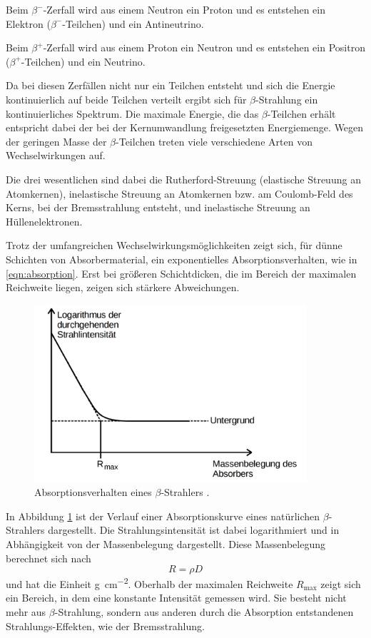 \documentclass[
  bibliography=totoc,     %
  captions=tableheading,  %
  titlepage=firstiscover, %
]{scrartcl}
\begin{document}
\noindent
Beim $\beta^-$-Zerfall wird aus einem Neutron ein Proton und es entstehen
ein Elektron ($\beta^-$-Teilchen) und ein Antineutrino.

\noindent
Beim $\beta^+$-Zerfall wird aus einem Proton ein Neutron und es entstehen
ein Positron ($\beta^+$-Teilchen) und ein Neutrino.

\noindent
Da bei diesen Zerfällen nicht nur ein Teilchen entsteht und sich die Energie
kontinuierlich auf beide Teilchen verteilt ergibt sich für $\beta$-Strahlung
ein kontinuierliches Spektrum. Die maximale Energie, die das $\beta$-Teilchen
erhält entspricht dabei der bei der Kernumwandlung freigesetzten Energiemenge.
Wegen der geringen Masse der $\beta$-Teilchen treten viele verschiedene Arten
von Wechselwirkungen auf.

\noindent
Die drei wesentlichen sind dabei die Rutherford-Streuung (elastische Streuung
an Atomkernen), inelastische Streuung an Atomkernen bzw. am Coulomb-Feld des
Kerns, bei der Bremsstrahlung entsteht, und inelastische Streuung an
Hüllenelektronen.

\noindent
Trotz der umfangreichen Wechselwirkungsmöglichkeiten zeigt sich, für dünne Schichten
von Absorbermaterial, ein exponentielles Absorptionsverhalten, wie in \eqref{eqn:absorption}.
Erst bei größeren Schichtdicken, die im Bereich der maximalen Reichweite liegen,
zeigen sich stärkere Abweichungen.
\begin{figure}[htb]
  \centering
  \includegraphics[width=0.9\textwidth]{V7042.png}
  \caption{Absorptionsverhalten eines $\beta$-Strahlers \cite{anleitung}.}
  \label{fig:V7042}
\end{figure}
In Abbildung \ref{fig:V7042} ist der Verlauf einer Absorptionskurve eines natürlichen
$\beta$-Strahlers dargestellt. Die Strahlungsintensität ist dabei logarithmiert
und in Abhängigkeit von der Massenbelegung dargestellt. Diese Massenbelegung
berechnet sich nach
\begin{equation}
  R = \rho D
  \label{eqn:massenbel}
\end{equation}
und hat die Einheit \si{\gram\per\square\centi\meter}.
Oberhalb der maximalen Reichweite $R_\mathup{max}$ zeigt sich ein Bereich,
in dem eine konstante Intensität gemessen wird. Sie besteht nicht mehr aus
$\beta$-Strahlung, sondern aus anderen durch die Absorption entstandenen
Strahlungs-Effekten, wie der Bremsstrahlung.
\end{document}
